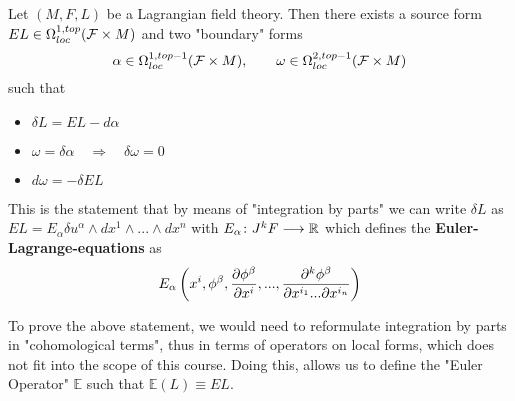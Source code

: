 \begin{theo}
  Let $(M,F,L)$ be a Lagrangian field theory. Then there exists a source form $EL \in \Omega^{1,top}_{loc}({\mathcal{F}} \times M)$ and two "boundary" forms
  $$ \alpha \in \Omega^{1,top-1}_{loc}({\mathcal{F}} \times M), \quad \quad \omega \in \Omega^{2,top-1}_{loc}({\mathcal{F}} \times M) $$
  such that
  \begin{itemize}
    \item $\delta L = EL - d \alpha$
    \item $\omega = \delta \alpha \quad \Rightarrow \quad \delta \omega = 0$
    \item $d\omega = - \delta EL$
  \end{itemize}
\end{theo}

This is the statement that by means of "integration by parts" we can write $\delta L$ as $EL = E_\alpha \delta u^\alpha \wedge dx^1 \wedge ... \wedge dx^n$ with $E_\alpha\colon J^k F \longrightarrow \mathbb{R}$ which defines the \textbf{Euler-Lagrange-equations} as
$$ E_\alpha  \left(x^i, \phi^\beta, \dell{\phi^\beta}{x^i}, ..., \dell{^k \phi^\beta}{x^{i_1} ... \partial x^{i_n}}\right) $$

To prove the above statement, we would need to reformulate integration by parts in "cohomological terms", thus in terms of operators on local forms, which does not fit into the scope of this course. Doing this, allows us to define the "Euler Operator" $\mathbb{E}$ such that $\mathbb{E}(L) \equiv EL$.


\newpage
